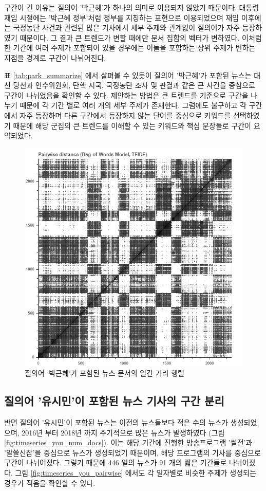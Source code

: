 \documentclass[oneside, ko,phd]{snuthesis_utf8_kor}
\begin{document}
구간이 긴 이유는 질의어 '박근혜'가 하나의 의미로 이용되지 않았기 때문이다.
대통령 재임 시절에는 '박근혜 정부'처럼 정부를 지칭하는 표현으로 이용되었으며 재임 이후에는 국정농단 사건과 관련된 많은 기사에서 세부 주제와 관계없이 질의어가 자주 등장하였기 때문이다.
그 결과 큰 트렌드가 변할 때에만 문서 집합의 벡터가 변하였다.
이처럼 한 기간에 여러 주제가 포함되어 있을 경우에는 이들을 포함하는 상위 주제가 변하는 지점을 경계로 구간이 나뉘어진다.

표 \ref{tab:park_summarize} 에서 살펴볼 수 있듯이 질의어 '박근혜'가 포함된 뉴스는 대선 당선과 인수위원회, 탄핵 시국, 국정농단 조사 및 판결과 같은 큰 사건을 중심으로 구간이 나뉘었음을 확인할 수 있다.
제안하는 방법은 큰 트렌드를 기준으로 구간을 나누기 때문에 각 기간 별로 여러 개의 세부 주제가 존재한다.
그럼에도 불구하고 각 구간에서 자주 등장하며 다른 구간에서 등장하지 않는 단어를 중심으로 키워드를 선택하였기 때문에 해당 군집의 큰 트렌드를 이해할 수 있는 키워드와 핵심 문장들로 구간이 요약되었다.

\begin{figure}[H]
\centering
\includegraphics[keepaspectratio=true, width=0.5\linewidth]{fig/timeseries_park_pairwise.png}
\caption{질의어 '박근혜'가 포함된 뉴스 문서의 일간 거리 행렬}
\label{fig:timeseries_park_pairwise}
\end{figure}

\subsection{질의어 '유시민'이 포함된 뉴스 기사의 구간 분리}

반면 질의어 '유시민'이 포함된 뉴스는 이전의 뉴스들보다 적은 수의 뉴스가 생성되었으며, 2016년 부터 2018년 까지 주기적으로 많은 뉴스가 발생하였다 (그림 \ref{fig:timeseries_you_num_docs}).
이는 해당 기간에 진행한 방송프로그램 '썰전'과 '알쓸신잡'을 중심으로 뉴스가 생성되었기 때문이며, 해당 프로그램의 기사를 중심으로 구간이 나뉘어졌다.
그렇기 때문에 446 일의 뉴스가 91 개의 짧은 기간들로 나뉘어졌다.
그림 \ref{fig:timeseries_you_pairwise} 에서도 각 일자별로 비슷한 주제가 생성되는 경우가 적음을 확인할 수 있다.
\end{document}
